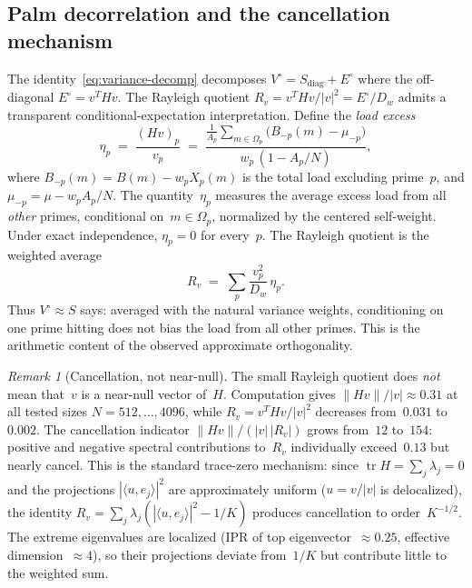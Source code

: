 \documentclass[11pt]{article}
\theoremstyle{definition}
\theoremstyle{remark}
\newtheorem{remark}[theorem]{Remark}
\begin{document}
\subsection{Palm decorrelation and the cancellation mechanism}
\label{ssec:palm}

The identity~\eqref{eq:variance-decomp} decomposes
$V^\circ = S_{\mathrm{diag}} + E^\circ$ where the off-diagonal
$E^\circ = v^T H v$.
The Rayleigh quotient $R_v = v^T H v / |v|^2 = E^\circ / D_w$
admits a transparent conditional-expectation interpretation.
Define the \emph{load excess}
\begin{equation}\label{eq:palm}
  \eta_p
  \;=\;
  \frac{(Hv)_p}{v_p}
  \;=\;
  \frac{
    \displaystyle
    \frac{1}{A_p}\!\sum_{m \in \Omega_p}
    \!\bigl(B_{-p}(m) - \mu_{-p}\bigr)
  }{w_p\,(1 - A_p/N)},
\end{equation}
where $B_{-p}(m) = B(m) - w_p X_p(m)$ is the total
load excluding prime~$p$, and
$\mu_{-p} = \mu - w_p A_p / N$.
The quantity~$\eta_p$ measures the average excess load
from all \emph{other} primes, conditional on~$m \in \Omega_p$,
normalized by the centered self-weight.
Under exact independence, $\eta_p = 0$ for every~$p$.
The Rayleigh quotient is the weighted average
\begin{equation}\label{eq:rayleigh-palm}
  R_v
  \;=\;
  \sum_p \frac{v_p^2}{D_w}\,\eta_p.
\end{equation}
Thus $V^\circ \approx S$ says: averaged with
the natural variance weights, conditioning on one
prime hitting does not bias the load from all other primes.
This is the arithmetic content of the observed
approximate orthogonality.

\begin{remark}[Cancellation, not near-null]\label{rem:cancellation}
The small Rayleigh quotient does \emph{not} mean
that~$v$ is a near-null vector of~$H$.
Computation gives $\|Hv\|/|v| \approx 0.31$
at all tested sizes $N = 512, \ldots, 4096$,
while $R_v = v^T H v / |v|^2$ decreases from~$0.031$
to~$0.002$.
The cancellation indicator
$\|Hv\|/(|v|\,|R_v|)$ grows from~$12$ to~$154$:
positive and negative spectral contributions to~$R_v$
individually exceed~$0.13$ but nearly cancel.
This is the standard trace-zero mechanism:
since $\operatorname{tr} H = \sum_j \lambda_j = 0$
and the projections $|\langle u, e_j\rangle|^2$
are approximately uniform ($u = v/|v|$ is
delocalized), the identity
$R_v = \sum_j \lambda_j
(|\langle u, e_j\rangle|^2 - 1/K)$
produces cancellation to order~$K^{-1/2}$.
The extreme eigenvalues are localized
(IPR of top eigenvector~$\approx 0.25$,
effective dimension~$\approx 4$), so their
projections deviate from~$1/K$ but contribute
little to the weighted sum.
\end{remark}
\end{document}
